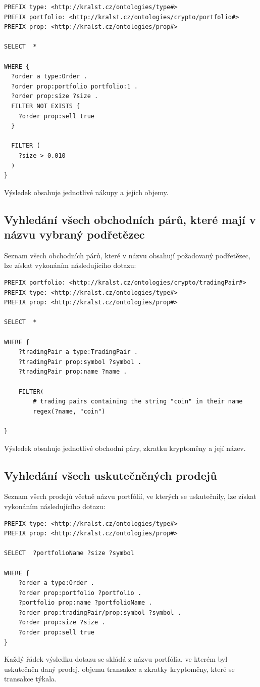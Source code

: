 \documentclass[12pt, a4paper]{article}
\begin{document}
\begin{lstlisting}
PREFIX type: <http://kralst.cz/ontologies/type#>
PREFIX portfolio: <http://kralst.cz/ontologies/crypto/portfolio#>
PREFIX prop: <http://kralst.cz/ontologies/prop#>

SELECT  *

WHERE {
  ?order a type:Order .
  ?order prop:portfolio portfolio:1 .
  ?order prop:size ?size .
  FILTER NOT EXISTS {
  	?order prop:sell true
  }
  
  FILTER (
  	?size > 0.010
  )
}
\end{lstlisting}
Výsledek obsahuje jednotlivé nákupy a jejich objemy.

\subsection{Vyhledání všech obchodních párů, které mají v názvu vybraný podřetězec}
Seznam všech obchodních párů, které v názvu obsahují požadovaný podřetězec, lze získat vykonáním následujícího dotazu:

\begin{lstlisting}
PREFIX portfolio: <http://kralst.cz/ontologies/crypto/tradingPair#>
PREFIX type: <http://kralst.cz/ontologies/type#>
PREFIX prop: <http://kralst.cz/ontologies/prop#>

SELECT  *

WHERE {
    ?tradingPair a type:TradingPair .
    ?tradingPair prop:symbol ?symbol .
    ?tradingPair prop:name ?name .

    FILTER(
        # trading pairs containing the string "coin" in their name
        regex(?name, "coin")
    
}
\end{lstlisting}
Výsledek obsahuje jednotlivé obchodní páry, zkratku kryptoměny a její název.

\subsection{Vyhledání všech uskutečněných prodejů}
Seznam všech prodejů včetně názvu portfólií, ve kterých se uskutečnily, lze získat vykonáním následujícího dotazu:

\begin{lstlisting}
PREFIX type: <http://kralst.cz/ontologies/type#>
PREFIX prop: <http://kralst.cz/ontologies/prop#>

SELECT  ?portfolioName ?size ?symbol

WHERE {
  	?order a type:Order .
  	?order prop:portfolio ?portfolio .
  	?portfolio prop:name ?portfolioName .
  	?order prop:tradingPair/prop:symbol ?symbol .
  	?order prop:size ?size .
  	?order prop:sell true
}

\end{lstlisting}
Každý řádek výsledku dotazu se skládá z názvu portfólia, ve kterém byl uskutečněn daný prodej, objemu transakce a zkratky kryptoměny, které se transakce týkala.
\end{document}
